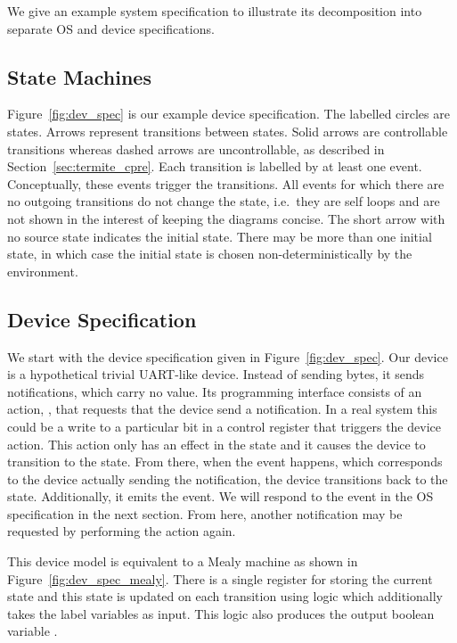 We give an example system specification to illustrate its decomposition into separate OS and device specifications. 

\subsection{State Machines}

Figure~\ref{fig:dev_spec} is our example device specification. The labelled circles are states. Arrows represent transitions between states. Solid arrows are controllable transitions whereas dashed arrows are uncontrollable, as described in Section~\ref{sec:termite_cpre}. Each transition is labelled by at least one event. Conceptually, these events trigger the transitions. All events for which there are no outgoing transitions do not change the state, i.e.\ they are self loops and are not shown in the interest of keeping the diagrams concise. The short arrow with no source state indicates the initial state. There may be more than one initial state, in which case the initial state is chosen non-deterministically by the environment.

\subsection{Device Specification}

We start with the device specification given in Figure~\ref{fig:dev_spec}. Our device is a hypothetical trivial UART-like device. Instead of sending bytes, it sends notifications, which carry no value. Its programming interface consists of an action, , that requests that the device send a notification. In a real system this could be a write to a particular bit in a control register that triggers the device action. This action only has an effect in the  state and it causes the device to transition to the  state. From there, when the  event happens, which corresponds to the device actually sending the notification, the device transitions back to the  state. Additionally, it emits the  event. We will respond to the  event in the OS specification in the next section. From here, another notification may be requested by performing the  action again.

This device model is equivalent to a Mealy machine as shown in Figure~\ref{fig:dev_spec_mealy}. There is a single register for storing the current state and this state is updated on each transition using logic which additionally takes the label variables as input. This logic also produces the output boolean variable .

